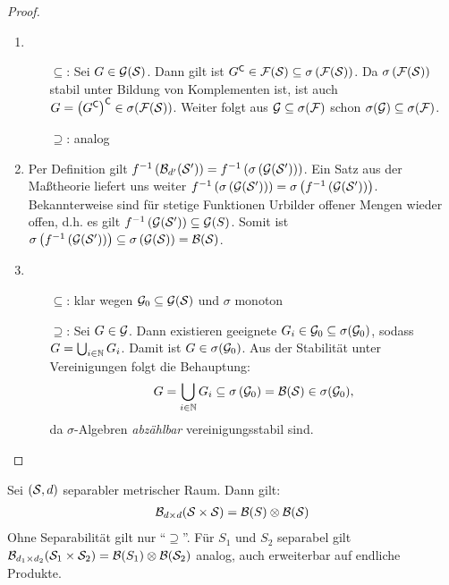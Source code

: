 \begin{proof}
	\begin{enumerate}[label=(zu \alph*), leftmargin=*]
		\item \begin{itemize}
			\item[$\subseteq$:] Sei $G \in \G(\S)$. Dann gilt ist $G^\complement \in \mathcal{F}(\S) \subseteq \sigma\brackets{\mathcal{F}(\S)}$. Da $\sigma\brackets{\mathcal{F}(\S)}$ stabil unter Bildung von Komplementen ist, ist auch $G = \brackets{G^\complement}^\complement \in \sigma(\mathcal{F}(\S))$. Weiter folgt aus $\G \subseteq \sigma(\mathcal{F})$ schon $\sigma(\G) \subseteq \sigma(\mathcal{F})$.
			\item[$\supseteq$:] analog
		\end{itemize}
		\item Per Definition gilt $f^{-1}\brackets{\B_{d'}(\S')}
		= f^{-1}\brackets{\sigma\brackets{\G(\S')}}$. 
		Ein Satz aus der Maßtheorie liefert uns weiter $f^{-1}\brackets{\sigma\brackets{\G(\S')}} = \sigma\brackets{f^{-1}\brackets{\G(\S')}}$. 		
		Bekannterweise sind für stetige Funktionen Urbilder offener Mengen wieder offen, d.h. es gilt $f^{-1}\brackets{\G(\S')} \subseteq \G(S)$. 
		Somit ist $\sigma\brackets{f^{-1}\brackets{\G(\S')}} \subseteq \sigma\brackets{\G(\S)} = \borel{\S}$.
		\item \begin{itemize}
			\item[$\subseteq$:] klar wegen $\G_0 \subseteq \G(\S)$ und $\sigma$ monoton
			\item[$\supseteq$:] Sei $G \in \G$. Dann existieren geeignete $G_i \in \G_0 \subseteq \sigma(\G_0)$, sodass $G = \bigcup_{i \in \N} G_i$. Damit ist $G \in \sigma(\G_0)$.
			Aus der Stabilität unter Vereinigungen folgt die Behauptung:
			\begin{align*}
				G=\bigcup_{i \in \N} G_i \subseteq \sigma\brackets{\G_0}=\B(\S) \in \sigma(\G_0),
			\end{align*}
			da $\sigma$-Algebren \textit{abzählbar} vereinigungsstabil sind.
		\end{itemize}
	\end{enumerate} 
\end{proof}

\begin{satz}\label{satz: 3.3}
	Sei $(\S,d)$ separabler metrischer Raum. Dann gilt:
	\begin{align*}
		\B_{d \times  d}(\S \times \S) = \B(S) \otimes \B(\S)
	\end{align*}
	Ohne Separabilität gilt nur \enquote{$\supseteq$}.
	Für $S_1$ und $S_2$ separabel gilt $\B_{d_1  \times  d_2}(\S_1 \times  \S_2) = \B(S_1) \otimes \B(\S_2)$ analog, auch erweiterbar auf endliche Produkte.
\end{satz}

